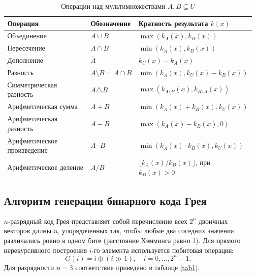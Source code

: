 \documentclass[14pt]{extreport}
\begin{document}
\begin{table}[H]
\centering
\caption{Операции над мультимножествами $A, B \subseteq U$}
\label{tab:ops}
\begin{tabular}{|p{}|p{}|p{}|}
\hline
\textbf{Операция} & \textbf{Обозначение} & \textbf{Кратность результата $k(x)$} \\ \hline
Объединение & $A \cup B$ & $\max(k_A(x), k_B(x))$ \\ \hline
Пересечение & $A \cap B$ & $\min(k_A(x), k_B(x))$ \\ \hline
Дополнение & $\overline{A}$ & $k_U(x) - k_A(x)$ \\ \hline
Разность & $A \setminus B = A \cap \overline{B}$ & $\min(k_A(x), k_U(x) - k_B(x))$ \\ \hline
Симметрическая разность & $A \triangle B$ & $\max(k_{A \setminus B}(x), k_{B \setminus A}(x))$ \\ \hline
Арифметическая сумма & $A + B$ & $\min(k_A(x) + k_B(x), k_U(x))$ \\ \hline
Арифметическая разность & $A - B$ & $\max(k_A(x) - k_B(x), 0)$ \\ \hline
Арифметическое произведение & $A \cdot B$ & $\min(k_A(x) \cdot k_B(x), k_U(x))$ \\ \hline
Арифметическое деление & $A / B$ & $\lfloor k_A(x) / k_B(x) \rfloor$, при $k_B(x) > 0$ \\ \hline
\end{tabular}
\end{table}

{\subsection{Алгоритм генерации бинарного кода Грея}}
$n$-разрядный код Грея представляет собой перечисление всех $2^n$ двоичных векторов длины $n$, упорядоченных так, чтобы любые два соседних значения различались ровно в одном бите (расстояние Хэмминга равно 1). Для прямого нерекурсивного построения $i$-го элемента используется побитовая операция:
\begin{equation}
    G(i) = i \oplus (i \gg 1), \quad i = 0, \dots, 2^n - 1.
\end{equation}
Для разрядности $n=3$ соответствие приведено в таблице \ref{tab1}.
\end{document}
